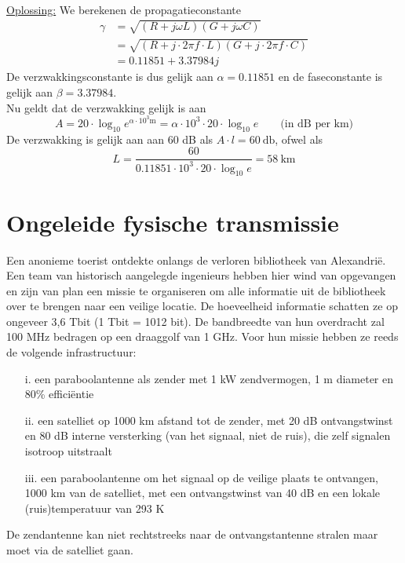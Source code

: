 \documentclass[kulak]{kulakarticle}
\begin{document}
	\hfill \\
	\underline{Oplossing:}
	We berekenen de propagatieconstante \begin{align*}
		\gamma &= \sqrt{(R+j\omega L)(G+j\omega C)} \\
				&= \sqrt{(R+j \cdot 2\pi f \cdot L)(G+j \cdot 2\pi f \cdot C)} \\
				&= 0.11851 + 3.37984j
	\end{align*}
	De verzwakkingsconstante is dus gelijk aan \(\alpha = 0.11851\) en de faseconstante is gelijk aan \(\beta = 3.37984\). \\Nu geldt dat de verzwakking gelijk is aan \[
	A = 20 \cdot \log_{10} e^{\alpha \cdot 10^3 \unit{\meter}}=\alpha \cdot 10^3 \cdot 20 \cdot \log_{10} e \qquad \text{(in dB per km)}\] De verzwakking is gelijk aan aan 60 dB als \(A \cdot l = \SI{60}{\decibel}\), ofwel als \[L=\frac{60}{0.11851\cdot 10^3\cdot 20 \cdot \log_{10} e} = \boxed{\SI{58}{\kilo\meter}}\]

\newpage
	\section{Ongeleide fysische transmissie}

	Een anonieme toerist ontdekte onlangs de verloren bibliotheek van Alexandrië.
	Een team van historisch aangelegde ingenieurs hebben hier wind van opgevangen en zijn van plan een missie te organiseren om alle informatie uit de bibliotheek over te brengen naar een veilige locatie. De hoeveelheid informatie schatten ze op ongeveer 3,6 Tbit (1 Tbit = 1012 bit). De bandbreedte van hun overdracht
	zal 100 MHz bedragen op een draaggolf van 1 GHz. Voor hun missie hebben ze reeds de volgende infrastructuur:\begin{enumerate}
		\item[i. ] een paraboolantenne als zender met 1 kW zendvermogen, 1 m diameter en 80\% efficiëntie
		\item[ii. ] een satelliet op 1000 km afstand tot de zender, met 20 dB ontvangstwinst en 80 dB interne versterking (van het signaal, niet de ruis), die zelf signalen isotroop uitstraalt
		\item[iii. ] een paraboolantenne om het signaal op de veilige plaats te ontvangen, 1000 km van de satelliet, met een ontvangstwinst van 40 dB en een lokale (ruis)temperatuur van 293 K	\end{enumerate}

	De zendantenne kan niet rechtstreeks naar de ontvangstantenne stralen maar moet via de satelliet gaan.
\end{document}
